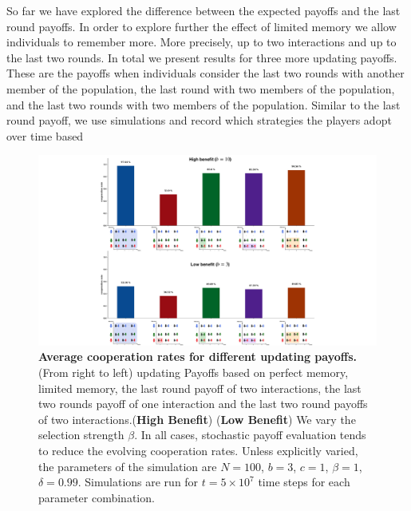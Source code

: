 \documentclass[11pt]{article}
\theoremstyle{plainCl1}
\theoremstyle{plainCl2}
\begin{document}
So far we have explored the difference between the expected payoffs and the last
round payoffs. In order to explore further the effect of limited memory we allow
individuals to remember more. More precisely, up to two interactions and up to
the last two rounds. In total we present results for three more updating
payoffs. These are the payoffs when individuals consider the last two rounds
with another member of the population, the last round with two members of the
population, and the last two rounds with two members of the population. Similar
to the last round payoff, we use simulations and record which strategies the
players adopt over time based


\begin{figure}[!htbp]
  \centering
  \includegraphics[width=\textwidth]{static/more_memory_summary_results.pdf}
  \caption{{\bf Average cooperation rates for different updating payoffs.} (From
  right to left) updating Payoffs based  on perfect memory, limited memory,
  the last round payoff of two interactions,
  the last two rounds payoff of one interaction and 
  the last two round payoffs of two interactions.({\bf High Benefit})
  ({\bf Low Benefit}) We vary the selection strength $\beta$. In all
  cases, stochastic payoff evaluation tends to reduce the evolving cooperation
  rates. Unless explicitly varied, the parameters of the simulation are
  $N\!=\!100$, $b\!=\!3$, $c\!=\!1$, $\beta\!=\!1$, $\delta\!=\!0.99$.
  Simulations are run for $t\!=\!5\times 10^7$ time steps for each parameter
  combination.}\label{fig:cooperation_rate_updating_payoffs}
\end{figure}
\end{document}
